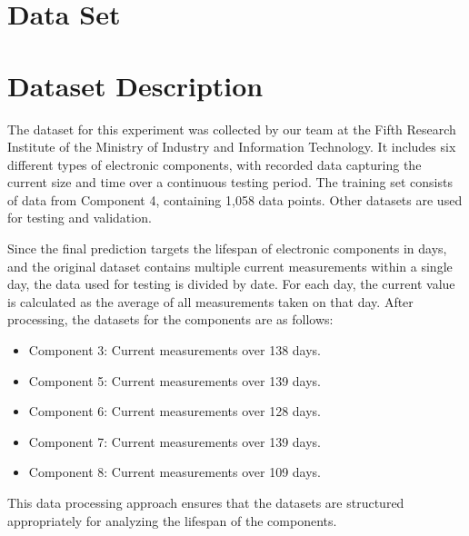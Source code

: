 \section{Data Set}
\label{sec:dataset}
\section{Dataset Description}

The dataset for this experiment was collected by our team at the Fifth Research Institute of the Ministry of Industry and Information Technology. It includes six different types of electronic components, with recorded data capturing the current size and time over a continuous testing period. The training set consists of data from Component 4, containing 1,058 data points. Other datasets are used for testing and validation.

Since the final prediction targets the lifespan of electronic components in days, and the original dataset contains multiple current measurements within a single day, the data used for testing is divided by date. For each day, the current value is calculated as the average of all measurements taken on that day. After processing, the datasets for the components are as follows:
\begin{itemize}
    \item Component 3: Current measurements over 138 days.
    \item Component 5: Current measurements over 139 days.
    \item Component 6: Current measurements over 128 days.
    \item Component 7: Current measurements over 139 days.
    \item Component 8: Current measurements over 109 days.
\end{itemize}

This data processing approach ensures that the datasets are structured appropriately for analyzing the lifespan of the components.

